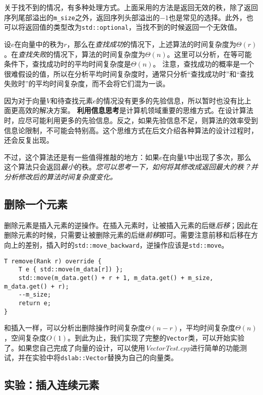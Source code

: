 关于找不到的情况，有多种处理方式。上面采用的方法是返回无效的秩，除了返回序列尾部溢出的\lstinline{m_size}之外，返回序列头部溢出的$-1$也是常见的选择。此外，也可以将返回值的类型改为\lstinline{std::optional}，当找不到的时候返回一个无效值。

设$e$在向量中的秩为$r$，那么在\textit{查找成功}的情况下，上述算法的时间复杂度为$\Theta(r)$。在\textit{查找失败}的情况下，算法的时间复杂度为$\Theta(n)$。这里可以分析，在等可能条件下，查找成功时的平均时间复杂度是$\Theta(n)$。
注意，查找成功的概率是一个很难假设的值，所以在分析平均时间复杂度时，通常只分析“查找成功时”和“查找失败时”的平均时间复杂度，而不会将它们混为一谈。

因为对于向量$V$和待查找元素$e$的情况没有更多的先验信息，所以暂时也没有比上面更高效的解决方案。
\textbf{利用信息思考}是计算机领域重要的思维方式。在设计算法时，应尽可能利用更多的先验信息。反之，如果先验信息不足，则算法的效率受到信息论限制，不可能会特别高。这个思维方式在后文介绍各种算法的设计过程时，还会反复出现。

不过，这个算法还是有一些值得推敲的地方：如果$e$在向量$V$中出现了多次，那么这个算法只会返回\textit{最小}的秩。\textit{您可以思考一下，如何将其修改成返回最大的秩？并分析修改后的算法时间复杂度变化。}

\subsection{删除一个元素}
\label{seg:删除一个元素}
删除元素是插入元素的逆操作。在插入元素时，让被插入元素的后继\textit{后移}；因此在删除元素的时候，只需要让被删除元素的后继\textit{前移}即可。需要注意前移和后移在方向上的差别，插入时的\lstinline{std::move_backward}，逆操作应该是\lstinline{std::move}。

\begin{lstlisting}
T remove(Rank r) override {
    T e { std::move(m_data[r]) };
    std::move(m_data.get() + r + 1, m_data.get() + m_size, m_data.get() + r);
    --m_size;
    return e;
}
\end{lstlisting}

和插入一样，可以分析出删除操作时间复杂度$\Theta(n-r)$，平均时间复杂度$\Theta(n)$，空间复杂度$O(1)$。到此为止，我们实现了完整的\lstinline{Vector}类，可以开始实验了。如果您自己完成了向量的设计，可以使用\textit{VectorTest.cpp}进行简单的功能测试，并在实验中将\lstinline{dslab::Vector}替换为自己的向量类。

\subsection{实验：插入连续元素}

